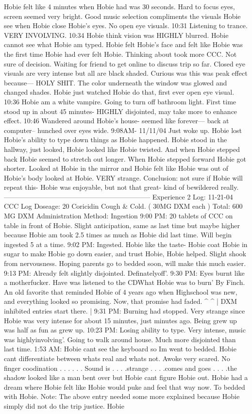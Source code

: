 \documentclass[12pt]{book}
\begin{document}
Hobie felt like 4 minutes when Hobie had was 30 seconds. Hard to focus eyes, screen seemed very bright. Good music selection compliments the visuals Hobie see when Hobie close Hobie's eyes. No open eye visuals. 10:31 Listening to trance. VERY INVOLVING. 10:34 Hobie think vision was HIGHLY blurred. Hobie cannot see what Hobie am typed. Hobie felt Hobie's face and felt like Hobie was the first time Hobie had ever felt Hobie. Thinking about took more CCC. Not sure of decision. Waiting for friend to get online to discuss trip so far. Closed eye visuals are very intense but all are black shaded. Curious was this was peak effect because--- HOLY SHIT. The color underneath the window was glowed and changed shades. Hobie just watched Hobie do that, first ever open eye visual. 10:36 Hobie am a white vampire. Going to turn off bathroom light. First time stood up in about 45 minutes- HIGHLY disjointed, may take more to enhance effect. 10:46 Wandered around Hobie's house- seemed like forever--- back at computer-- hunched over eyes wide. 9:08AM- 11/11/04 Just woke up. Hobie lost Hobie's ability to type down things as Hobie happened. Hobie stood in the hallway, just looked, Hobie looked like Hobie twisted. And when Hobie stepped back Hobie seemed to stretch out longer. When Hobie stepped forward Hobie got shorter. Looked at Hobie in the mirror and Hobie felt like Hobie was out of Hobie's body looked at Hobie. VERY strange. Conclusion: not sure if Hobie will repeat this- Hobie was enjoyable, but not that great- kind of bewildered really. ----------------------------------------------------------------- Experience 2 Log: 11-21-04 CCC Log Doseage: 20 Coricidin Cough \& Cold. ( 30MG DXM each ) Total: 600 MG DXM Administration Method: Ingestion 9:00 PM: 20 tablets of CCC on table in front of Hobie. Slight anticipation, same as last time but maybe higher because Hobie am took 2.5 times as much as Hobie did last time. Will begin ingested 5 at a time. 9:02 PM: Ingested. Hobie like the taste- Hobie coat Hobie in sugar to make Hobie go down easier, and trust Hobie, Hobie helped. Slight shook from nervousness. Hoping parents go to bedded soon, will make this much easier. 9:13 PM: Already felt slightly disjointed. Definatelyoff'. 9:30 PM: Eyes burnt like a motherfucker. Have was listened to the CDWhat Hobie was to burn' By Finch. An old favorite that reminded Hobie of 4 years ago when Highschool was new, and everything looked so promising. Now, that promise had faded. ^ ^ | DXM inhibited entries start there. | 9:31 PM: Burning had stopped. Very strange since Hobie was very intense for about 15 minutes, just minutes ago. Being grew up was half as fun as grew up. 10:23 PM: Losing ability to type. Very intense, music was highlyinvolving'. Going to walk around house. Much more disjointed than last time. 1:53 AM: Hobie cant see the keyboard so Im went to bedded. Hobie cant differentiate between whats real and whats not. Awoke very scared. No finger coodination . . .   . . .  Sound is . . .  .strange . . .  .comes and goes . . .  .the shadow looked like a man bent over but Hobie cant figure Hobie out. Hobie had a dream where Hobie felt like Hobie would puke and feel that way now. To bedded with Hobie. Note: The above entry needed some more explained because Hobie simply did not do the trip justice. Hobie 
\end{document}
